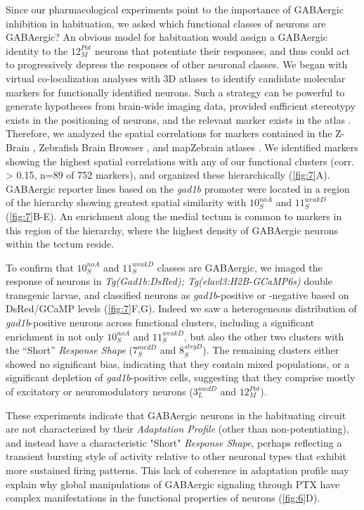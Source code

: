 \documentclass[9pt,lineno]{RandlettLab_elife}
\begin{document}
Since our pharmacological experiments point to the importance of GABAergic inhibition in habituation, we asked which functional classes of neurons are GABAergic? An obvious model for habituation would assign a GABAergic identity to the $12_{M}^{Pot}$ neurons that potentiate their responses, and thus could act to progressively depress the responses of other neuronal classes. We began with virtual co-localization analyses with 3D atlases to identify candidate molecular markers for functionally identified neurons. Such a strategy can be powerful to generate hypotheses from brain-wide imaging data, provided sufficient stereotypy exists in the positioning of neurons, and the relevant marker exists in the atlas \citep{Dunn2016-vt, Randlett2015-hy}. Therefore, we analyzed the spatial correlations for markers contained in the Z-Brain \citep{Randlett2015-hy}, Zebrafish Brain Browser \citep{Gupta2018-ik, Marquart2017-na, Tabor2018-bw}, and mapZebrain atlases \citep{Kunst2018-az, Shainer2022-sn}. We identified markers showing the highest spatial correlations with any of our functional clusters (corr. > 0.15, n=89 of 752 markers), and organized these hierarchically (\autoref{fig:7}A). GABAergic reporter lines based on the \emph{gad1b} promoter were located in a region of the hierarchy showing greatest spatial similarity with $10_{S}^{noA}$ and $11_{S}^{weakD}$(\autoref{fig:7}B-E). An enrichment along the medial tectum is common to markers in this region of the hierarchy, where the highest density of GABAergic neurons within the tectum reside. 

To confirm that $10_{S}^{noA}$ and $11_{S}^{weakD}$ classes are GABAergic, we imaged the response of neurons in \emph{Tg(Gad1b:DsRed); Tg(elavl3:H2B-GCaMP6s)} double transgenic larvae,  and classified neurons as \emph{gad1b}-positive or -negative based on DsRed/GCaMP levels (\autoref{fig:7}F,G). Indeed we saw a heterogeneous distribution of \emph{gad1b}-positive neurons across functional clusters, including a significant enrichment in not only $10_{S}^{noA}$ and $11_{S}^{weakD}$, but also the other two clusters with the “Short” \emph{Response Shape} ($7_{S}^{medD}$ and $8_{S}^{strgD}$). The remaining clusters either showed no significant bias, indicating that they contain mixed populations, or a significant depletion of \emph{gad1b}-positive cells, suggesting that they comprise mostly of excitatory or neuromodulatory neurons ($3_{L}^{medD}$ and $12_{M}^{Pot}$).

These experiments indicate that GABAergic neurons in the habituating circuit are not characterized by their \emph{Adaptation Profile} (other than non-potentiating), and instead have a characteristic "Short"  \emph{Response Shape}, perhaps reflecting a transient bursting style of activity relative to other neuronal types that exhibit more sustained firing patterns. This lack of coherence in adaptation profile may explain why global manipulations of GABAergic signaling through PTX have complex manifestations in the functional properties of neurons  (\autoref{fig:6}D).
\end{document}
